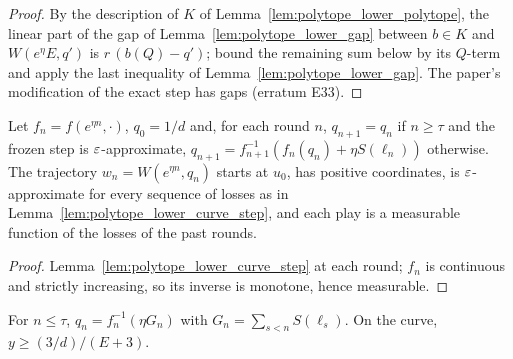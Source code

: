 \begin{proof}
  \leanok
  By the description of $K$ of Lemma~\ref{lem:polytope_lower_polytope}, the linear part of the gap
  of Lemma~\ref{lem:polytope_lower_gap} between $b \in K$ and $W(e^\eta E, q')$ is
  $r\,(b(Q) - q')$; bound the remaining sum below by its $Q$-term and apply the last inequality of
  Lemma~\ref{lem:polytope_lower_gap}. The paper's modification of the exact step has gaps (erratum
  E33).
\end{proof}

\begin{lemma}
  \label{lem:polytope_lower_steps}
  \leanok
  Let $f_n = f(e^{\eta n}, \cdot)$, $q_0 = 1/d$ and, for each round $n$, $q_{n+1} = q_n$ if
  $n \ge \tau$ and the frozen step is $\varepsilon$-approximate, $q_{n+1} = f_{n+1}^{-1}(f_n(q_n) +
  \eta S(\ell_n))$ otherwise. The trajectory $w_n = W(e^{\eta n}, q_n)$ starts at $u_0$, has
  positive coordinates, is $\varepsilon$-approximate for every sequence of losses as in
  Lemma~\ref{lem:polytope_lower_curve_step}, and each play is a measurable function of the losses of
  the past rounds.
\end{lemma}

\begin{proof}
  \leanok
  Lemma~\ref{lem:polytope_lower_curve_step} at each round; $f_n$ is continuous and strictly
  increasing, so its inverse is monotone, hence measurable.
\end{proof}

\begin{lemma}
  \label{lem:polytope_lower_exact_phase}
  \leanok
  For $n \le \tau$, $q_n = f_n^{-1}(\eta G_n)$ with $G_n = \sum_{s<n} S(\ell_s)$. On the curve,
  $y \ge (3/d)/(E + 3)$.
\end{lemma}

